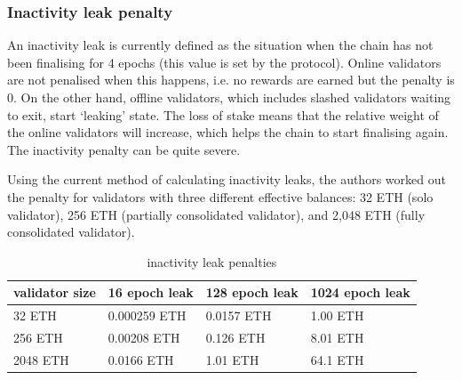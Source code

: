 \documentclass[UTF8]{article}
\begin{document}
\subsubsection*{Inactivity leak penalty}
An inactivity leak is currently defined as the situation when the chain has not been finalising for 4 epochs (this value is set by the protocol). Online validators are not penalised when this happens, i.e. no rewards are earned but the penalty is 0. On the other hand, offline validators, which includes slashed validators waiting to exit, start `leaking' state. The loss of stake means that the relative weight of the online validators will increase, which helps the chain to start finalising again. The inactivity penalty can be quite severe. 

Using the current method of calculating inactivity leaks, the authors worked out the penalty for validators with three different effective balances: 32 ETH (solo validator), 256 ETH (partially consolidated validator),  and 2,048 ETH (fully consolidated validator).

\begin{table}[htp]
\caption{inactivity leak penalties}
\begin{center}
\renewcommand{\arraystretch}{1.3}
\begin{tabular}{|l|l|l|l|}
\hline
\textbf{validator size} & \textbf{16 epoch leak} & \textbf{128 epoch leak} & \textbf{1024 epoch leak} \\
\hline
32 ETH & 0.000259 ETH & 0.0157 ETH & 1.00 ETH \\
256 ETH & 0.00208 ETH & 0.126 ETH & 8.01 ETH \\
2048 ETH & 0.0166 ETH & 1.01 ETH & 64.1 ETH \\
\hline
\end{tabular}
\end{center}
\label{default}
\end{table}%


\end{document}
